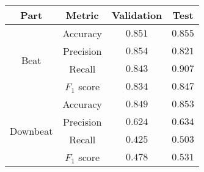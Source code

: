 \begin{tabular}{cc|cc}
    \textbf{Part}             & \textbf{Metric} & \textbf{Validation} & \textbf{Test} \\\hline
    \multirow{4}{*}{Beat}     & Accuracy        & $0.851$             & $0.855$       \\
                              & Precision       & $0.854$             & $0.821$       \\
                              & Recall          & $0.843$             & $0.907$       \\
                              & $F_1$ score     & $0.834$             & $0.847$       \\\hline
    \multirow{4}{*}{Downbeat} & Accuracy        & $0.849$             & $0.853$       \\
                              & Precision       & $0.624$             & $0.634$       \\
                              & Recall          & $0.425$             & $0.503$       \\
                              & $F_1$ score     & $0.478$             & $0.531$
\end{tabular}
